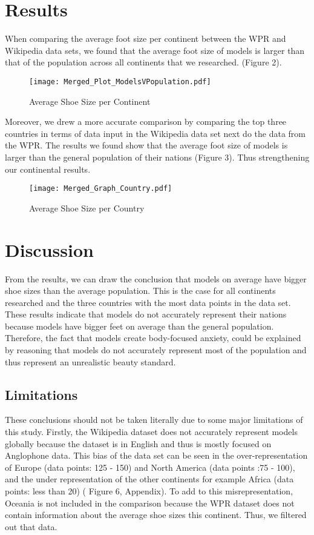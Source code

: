 \documentclass{article}
\begin{document}
\section{Results}
When comparing the average foot size per continent between the WPR and Wikipedia data sets, we found that the average foot size of models is larger than that of the population across all continents that we researched. (Figure 2).

\begin{figure}
 \centering
 \texttt{[image: Merged\_Plot\_ModelsVPopulation.pdf]}
 \caption{Average Shoe Size per Continent}
\end{figure}

Moreover, we drew a more accurate comparison by comparing the top three countries in terms of data input in the Wikipedia data set next do the data from the WPR. The results we found show that the average foot size of models is larger than the general population of their nations (Figure 3). Thus strengthening our continental results.
\begin{figure}
 \centering
 \texttt{[image: Merged\_Graph\_Country.pdf]}
 \caption{Average Shoe Size per Country}
\end{figure}

\section{Discussion}
From the results, we can draw the conclusion that models on average have bigger shoe sizes than the average population. This is the case for all continents researched and the three countries with the most data points in the data set. These results indicate that models do not accurately represent their nations because models have bigger feet on average than the general population. Therefore, the fact that models create body-focused anxiety, could be explained by reasoning that models do not accurately represent most of the population and thus represent an unrealistic beauty standard. 

\subsection{Limitations}
These conclusions should not be taken literally due to some major limitations of this study. Firstly, the Wikipedia dataset does not accurately represent models globally because the dataset is in English and thus is mostly focused on Anglophone data. This bias of the data set can be seen in the over-representation of Europe (data points: 125 - 150) and North America (data points :75 - 100), and the under representation of the other continents for example Africa (data points: less than 20) ( Figure 6, Appendix). To add to this misrepresentation, Oceania is not included in the comparison because the WPR dataset does not contain information about the average shoe sizes this continent. Thus, we filtered out that data. 
\end{document}
